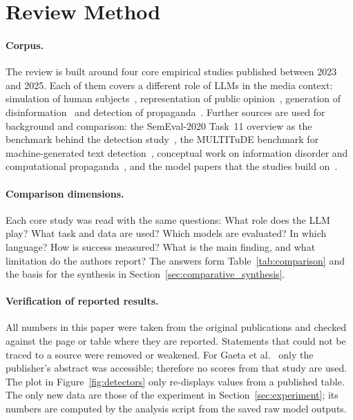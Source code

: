 \section{Review Method}
\label{sec:method}

\paragraph{Corpus.} The review is built around four core empirical studies published between 2023 and 2025. Each of them covers a different role of LLMs in the media context: simulation of human subjects~\cite{aher2023using}, representation of public opinion~\cite{santurkar2023whose}, generation of disinformation~\cite{vykopal2024disinformation} and detection of propaganda~\cite{gaeta2025towards}. Further sources are used for background and comparison: the SemEval-2020 Task~11 overview as the benchmark behind the detection study~\cite{dasanmartino2020semeval}, the MULTITuDE benchmark for machine-generated text detection~\cite{macko2023multitude}, conceptual work on information disorder and computational propaganda~\cite{wardle2017information, woolley2018computational, buchanan2021truth}, and the model papers that the studies build on~\cite{brown2020language, openai2023gpt4, ouyang2022training}.

\paragraph{Comparison dimensions.} Each core study was read with the same questions: What role does the LLM play? What task and data are used? Which models are evaluated? In which language? How is success measured? What is the main finding, and what limitation do the authors report? The answers form Table~\ref{tab:comparison} and the basis for the synthesis in Section~\ref{sec:comparative_synthesis}.

\paragraph{Verification of reported results.} All numbers in this paper were taken from the original publications and checked against the page or table where they are reported. Statements that could not be traced to a source were removed or weakened. For Gaeta et al.~\cite{gaeta2025towards} only the publisher's abstract was accessible; therefore no scores from that study are used. The plot in Figure~\ref{fig:detectors} only re-displays values from a published table. The only new data are those of the experiment in Section~\ref{sec:experiment}; its numbers are computed by the analysis script from the saved raw model outputs.
